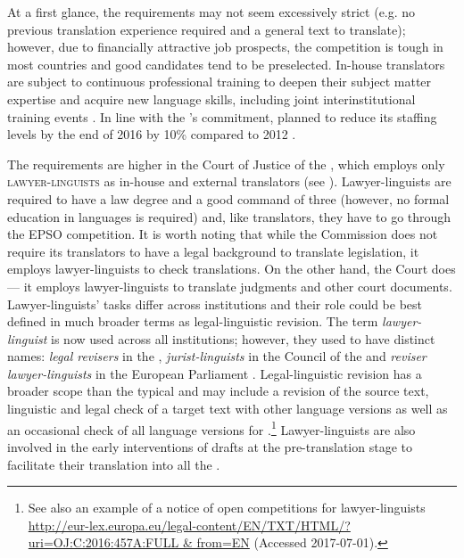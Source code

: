 \documentclass[output=paper]{langsci/langscibook}
\begin{document}
\largerpage
At a first glance, the requirements may not seem excessively strict (e.g. no previous translation experience required and a general text to translate); however, due to financially attractive job prospects, the competition is tough in most countries and good candidates tend to be preselected. In-house translators are subject to continuous professional training to deepen their subject matter expertise and acquire new language skills, including  joint interinstitutional training events \citep[8, 15]{DGT2016b}. In line with the ’s commitment,  planned to reduce its staffing levels by the end of 2016 by 10\% compared to 2012 \citep[14]{DGT2016a}.

\largerpage
The requirements are higher in the Court of Justice of the , which employs only \textsc{lawyer-linguists} as in-house and external translators (see ). Lawyer-linguists are required to have a law degree and a good command of three  (however, no formal education in languages is required) and, like translators, they have to go through the EPSO competition. It is worth noting that while the Commission does not require its translators to have a legal background to translate  legislation, it employs lawyer-linguists to check translations. On the other hand, the Court does — it employs lawyer-linguists to translate judgments and other court documents. Lawyer-linguists’ tasks differ across institutions and their role could be best defined in much broader terms as legal-linguistic revision. The term \textit{lawyer-linguist} is now used across all institutions; however, they used to have distinct names: \textit{legal revisers} in the , \textit{jurist-linguists} in the Council of the  and \textit{reviser lawyer-linguists} in the European Parliament \citep[186, 188, 189]{Šarčević2013}. Legal-linguistic revision has a broader scope than the typical  and may include a revision of the source text, linguistic and legal  check of a target text with other language versions as well as an occasional check of all language versions for  \citep[186]{Šarčević2013}.\footnote{See also an example of a notice of open competitions for lawyer-linguists \url{http://eur-lex.europa.eu/legal-content/EN/TXT/HTML/?uri=OJ:C:2016:457A:FULL & from=EN} (Accessed 2017-07-01).} Lawyer-linguists are also involved in the early interventions of drafts at the pre-translation stage to facilitate their translation into all the  \citep[187]{Šarčević2013}. 
\end{document}
